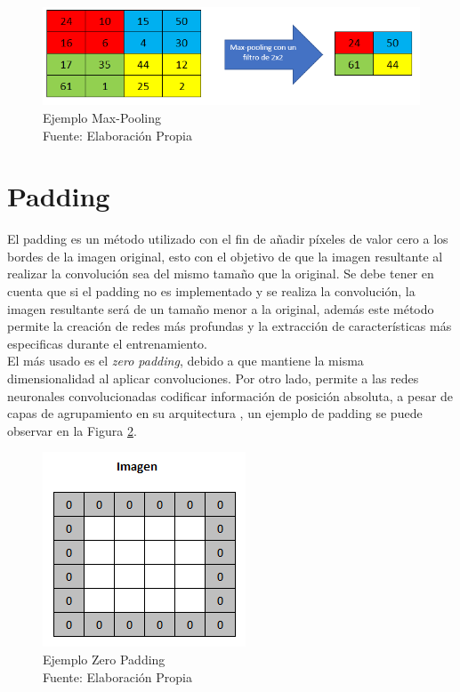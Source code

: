 \begin{figure}[ht]
	\centering
	\includegraphics[scale=0.6]{Figs/mp.png}
	\caption{Ejemplo Max-Pooling\\Fuente: Elaboración Propia}
	\label{mp}
\end{figure} 


\section{Padding}

El padding es un método utilizado con el fin de añadir píxeles de valor cero a los bordes de la imagen original, esto con el objetivo de que la imagen resultante al realizar la convolución sea del mismo tamaño que la original. Se debe tener en cuenta que si el padding no es implementado y se realiza la convolución, la imagen resultante será de un tamaño menor a la original, además este método permite la creación de redes más profundas y la extracción de características más especificas durante el entrenamiento.\\

El más usado es el \textit{zero padding}, debido a que mantiene la misma dimensionalidad al aplicar convoluciones. Por otro lado, permite a las redes neuronales convolucionadas codificar información de posición absoluta, a pesar de capas de agrupamiento en su arquitectura \cite{islam2021position}, un ejemplo de padding se puede observar en la Figura \ref{padding}.

\begin{figure}[ht]
	\centering
	\includegraphics[scale=0.65]{Figs/padding.png}
	\caption{Ejemplo Zero Padding \\Fuente: Elaboración Propia}
	\label{padding}
\end{figure}

